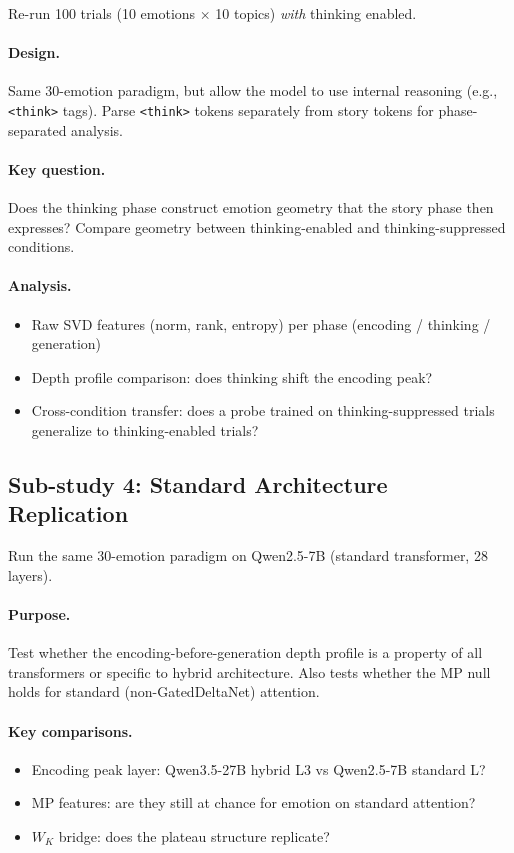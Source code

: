 \documentclass[11pt,letterpaper]{article}
\begin{document}
Re-run 100 trials (10 emotions $\times$ 10 topics) \emph{with}
thinking enabled.

\paragraph{Design.} Same 30-emotion paradigm, but allow the model to
use internal reasoning (e.g., \texttt{<think>} tags). Parse
\texttt{<think>} tokens separately from story tokens for
phase-separated analysis.

\paragraph{Key question.} Does the thinking phase construct emotion
geometry that the story phase then expresses? Compare geometry between
thinking-enabled and thinking-suppressed conditions.

\paragraph{Analysis.}
\begin{itemize}
  \item Raw SVD features (norm, rank, entropy) per phase (encoding /
    thinking / generation)
  \item Depth profile comparison: does thinking shift the encoding
    peak?
  \item Cross-condition transfer: does a probe trained on
    thinking-suppressed trials generalize to thinking-enabled trials?
\end{itemize}

\subsection*{Sub-study 4: Standard Architecture Replication}

Run the same 30-emotion paradigm on Qwen2.5-7B (standard transformer,
28 layers).

\paragraph{Purpose.} Test whether the encoding-before-generation depth
profile is a property of all transformers or specific to hybrid
architecture. Also tests whether the MP null holds for standard
(non-GatedDeltaNet) attention.

\paragraph{Key comparisons.}
\begin{itemize}
  \item Encoding peak layer: Qwen3.5-27B hybrid L3 vs Qwen2.5-7B
    standard L?
  \item MP features: are they still at chance for emotion on standard
    attention?
  \item $W_K$ bridge: does the plateau structure replicate?
\end{itemize}
\end{document}
